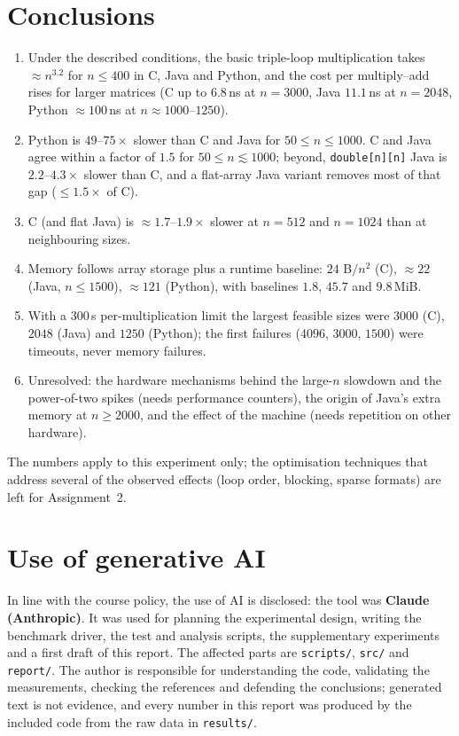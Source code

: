 \section{Conclusions}
\begin{enumerate}
  \item Under the described conditions, the basic triple-loop multiplication takes $\approx n^{3.2}$ for $n\le400$ in C, Java and
        Python, and the cost per multiply--add rises for larger matrices (C up to $6.8$\,ns at $n=3000$, Java $11.1$\,ns at
        $n=2048$, Python $\approx100$\,ns at $n\approx1000$--$1250$).
  \item Python is $49$--$75\times$ slower than C and Java for $50\le n\le1000$. C and Java agree within a factor of $1.5$ for $50\le n\lesssim1000$;
        beyond, \texttt{double[n][n]} Java is $2.2$--$4.3\times$ slower than C, and a flat-array Java variant removes most of that gap ($\le1.5\times$ of C).
  \item C (and flat Java) is $\approx1.7$--$1.9\times$ slower at $n=512$ and $n=1024$ than at neighbouring sizes.
  \item Memory follows array storage plus a runtime baseline: $24$ B$/n^2$ (C), $\approx22$ (Java, $n\le1500$), $\approx121$ (Python), with baselines $1.8$, $45.7$ and $9.8$\,MiB.
  \item With a $300$\,s per-multiplication limit the largest feasible sizes were $3000$ (C), $2048$ (Java) and $1250$ (Python); the first
        failures ($4096$, $3000$, $1500$) were timeouts, never memory failures.
  \item Unresolved: the hardware mechanisms behind the large-$n$ slowdown and the power-of-two spikes (needs performance counters),
        the origin of Java's extra memory at $n\ge2000$, and the effect of the machine (needs repetition on other hardware).
\end{enumerate}
The numbers apply to this experiment only; the optimisation techniques that address several of the observed effects (loop order, blocking, sparse
formats) are left for Assignment~2.

\section{Use of generative AI}
In line with the course policy, the use of AI is disclosed: the tool was \textbf{Claude (Anthropic)}. It was used for planning the experimental
design, writing the benchmark driver, the test and analysis scripts, the supplementary experiments and a first draft of this report.
The affected parts are \texttt{scripts/}, \texttt{src/} and \texttt{report/}. The author is responsible for understanding the code, validating the measurements,
checking the references and defending the conclusions; generated text is not evidence, and every number in this report was produced by the included code
from the raw data in \texttt{results/}.

